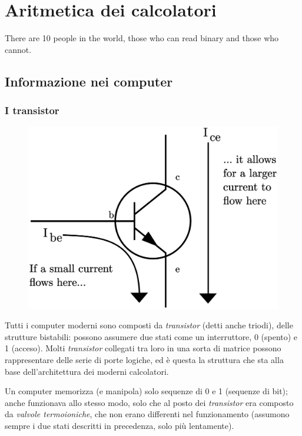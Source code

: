 \documentclass[class=book, crop=false, oneside]{standalone}
\begin{document}
\chapter{Aritmetica dei calcolatori}\begin{fquote}[Anonymous]There are 10 people in the world, those who can read binary and those who cannot.
 \end{fquote}

\section{Informazione nei computer}

\subsection{I transistor}

\begin{figure}
	\includegraphics[width=\linewidth]{transistor.eps}
	\label{fig:transistor}
	\centering
\end{figure}

Tutti i computer moderni sono composti da \emph{transistor} (detti anche triodi), delle strutture bistabili: possono assumere due stati come un interruttore, 0 (spento) e 1 (acceso). Molti \emph{transistor} collegati tra loro in una sorta di matrice possono rappresentare delle serie di porte logiche, ed è questa la struttura che sta alla base dell'architettura dei moderni calcolatori.

Un computer memorizza (e manipola) solo sequenze di 0 e 1 (sequenze di bit); anche  funzionava allo stesso modo, solo che al posto dei \emph{transistor} era composto da \emph{valvole termoioniche}, che non erano differenti nel funzionamento (assumono sempre i due stati descritti in precedenza, solo più lentamente).
\end{document}
